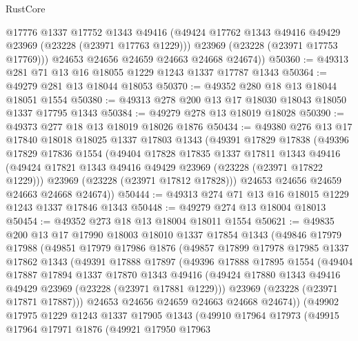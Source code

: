 \begin{lexlean}{RustCore}
\begin{coremodule}
          @17776
          @1337
          @17752
          @1343
          @49416
          (@49424 @17762 @1343 @49416 @49429 @23969 (@23228 (@23971 @17763 @1229)))
          @23969
          (@23228 (@23971 @17753 @17769)))
        @24653
        @24656
        @24659
        @24663
        @24668
        @24674))
@50360 := @49313 @281 @71 @13 @16 @18055 @1229 @1243 @1337 @17787 @1343
@50364 := @49279 @281 @13 @18044 @18053
@50370 := @49352 @280 @18 @13 @18044 @18051 @1554
@50380 := @49313 @278 @200 @13 @17 @18030 @18043 @18050 @1337 @17795 @1343
@50384 := @49279 @278 @13 @18019 @18028
@50390 := @49373 @277 @18 @13 @18019 @18026 @1876
@50434 := @49380
    @276
    @13
    @17
    @17840
    @18018
    @18025
    @1337
    @17803
    @1343
    (@49391
      @17829
      @17838
      (@49396
        @17829
        @17836
        @1554
        (@49404
          @17828
          @17835
          @1337
          @17811
          @1343
          @49416
          (@49424 @17821 @1343 @49416 @49429 @23969 (@23228 (@23971 @17822 @1229)))
          @23969
          (@23228 (@23971 @17812 @17828)))
        @24653
        @24656
        @24659
        @24663
        @24668
        @24674))
@50444 := @49313 @274 @71 @13 @16 @18015 @1229 @1243 @1337 @17846 @1343
@50448 := @49279 @274 @13 @18004 @18013
@50454 := @49352 @273 @18 @13 @18004 @18011 @1554
@50621 := @49835
    @200
    @13
    @17
    @17990
    @18003
    @18010
    @1337
    @17854
    @1343
    (@49846
      @17979
      @17988
      (@49851
        @17979
        @17986
        @1876
        (@49857
          @17899
          @17978
          @17985
          @1337
          @17862
          @1343
          (@49391
            @17888
            @17897
            (@49396
              @17888
              @17895
              @1554
              (@49404
                @17887
                @17894
                @1337
                @17870
                @1343
                @49416
                (@49424 @17880 @1343 @49416 @49429 @23969 (@23228 (@23971 @17881 @1229)))
                @23969
                (@23228 (@23971 @17871 @17887)))
              @24653
              @24656
              @24659
              @24663
              @24668
              @24674))
          (@49902
            @17975
            @1229
            @1243
            @1337
            @17905
            @1343
            (@49910
              @17964
              @17973
              (@49915
                @17964
                @17971
                @1876
                (@49921
                  @17950
                  @17963

\end{coremodule}
\end{lexlean}
